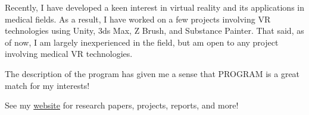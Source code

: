 \documentclass[a4paper,11pt,sans]{moderncv}
\begin{document}
Recently, I have developed a keen interest in virtual reality and its
applications in medical fields. As a result, I have worked on a few projects
involving VR technologies using Unity, 3ds Max, Z Brush, and Substance Painter.
That said, as of now, I am largely inexperienced in the field, but am open to
any project involving medical VR technologies.

The description of the program has given me a sense that PROGRAM is a great
match for my interests!

See my \href{https://www.davidoniani.com}{website} for research papers,
projects, reports, and more!

\makeletterclosing%
\end{document}
